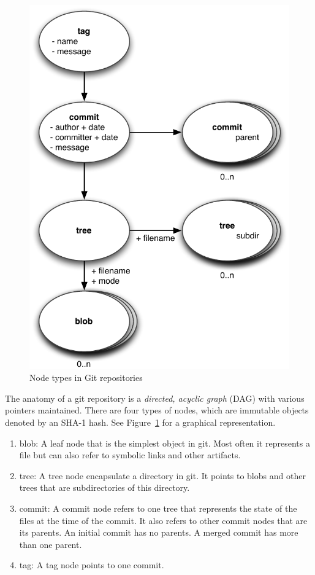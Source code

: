 \begin{figure}
\centering
\includegraphics[scale=\figscale]{./figures/git-nodes}
\caption{Node types in Git repositories} \label{fig:git-nodes}
\end{figure}
The anatomy of a git repository is a \textit{directed, acyclic graph} (DAG) with various pointers maintained. There are four types of nodes, which are immutable objects denoted by an SHA-1 hash.  See Figure~\ref{fig:git-nodes} for a graphical representation. 
\begin{enumerate}
\item blob: A leaf node that is the simplest object in git.  Most often it represents a file but can also refer to symbolic links and other artifacts.
\item tree: A tree node encapsulate a directory in git.  It points to blobs and other trees that are subdirectories of this directory.
\item commit: A commit node refers to one tree that represents the state of the files at the time of the commit.  It also refers to other commit nodes that are its parents.  An initial commit has no parents.  A merged commit has more than one parent.
\item tag: A tag node points to one commit.
\end{enumerate}

